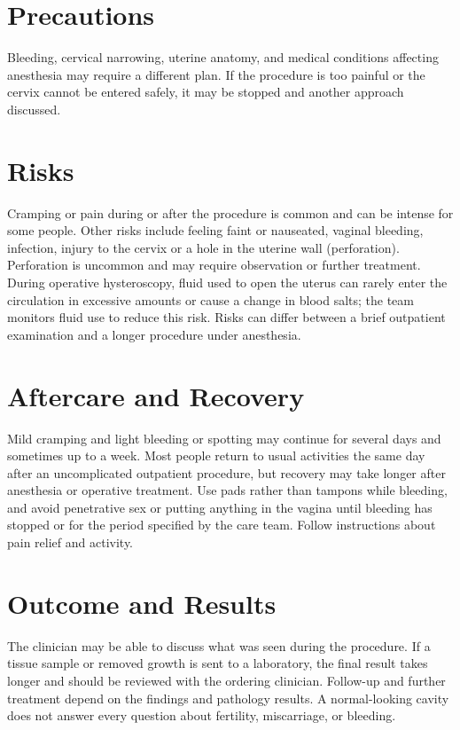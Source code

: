 \section*{Precautions}
Bleeding, cervical narrowing, uterine anatomy, and medical conditions affecting anesthesia may require a different plan. If the procedure is too painful or the cervix cannot be entered safely, it may be stopped and another approach discussed.

\section*{Risks}
Cramping or pain during or after the procedure is common and can be intense for some people. Other risks include feeling faint or nauseated, vaginal bleeding, infection, injury to the cervix or a hole in the uterine wall (perforation). Perforation is uncommon and may require observation or further treatment. During operative hysteroscopy, fluid used to open the uterus can rarely enter the circulation in excessive amounts or cause a change in blood salts; the team monitors fluid use to reduce this risk. Risks can differ between a brief outpatient examination and a longer procedure under anesthesia.

\section*{Aftercare and Recovery}
Mild cramping and light bleeding or spotting may continue for several days and sometimes up to a week. Most people return to usual activities the same day after an uncomplicated outpatient procedure, but recovery may take longer after anesthesia or operative treatment. Use pads rather than tampons while bleeding, and avoid penetrative sex or putting anything in the vagina until bleeding has stopped or for the period specified by the care team. Follow instructions about pain relief and activity.

\section*{Outcome and Results}
The clinician may be able to discuss what was seen during the procedure. If a tissue sample or removed growth is sent to a laboratory, the final result takes longer and should be reviewed with the ordering clinician. Follow-up and further treatment depend on the findings and pathology results. A normal-looking cavity does not answer every question about fertility, miscarriage, or bleeding.

